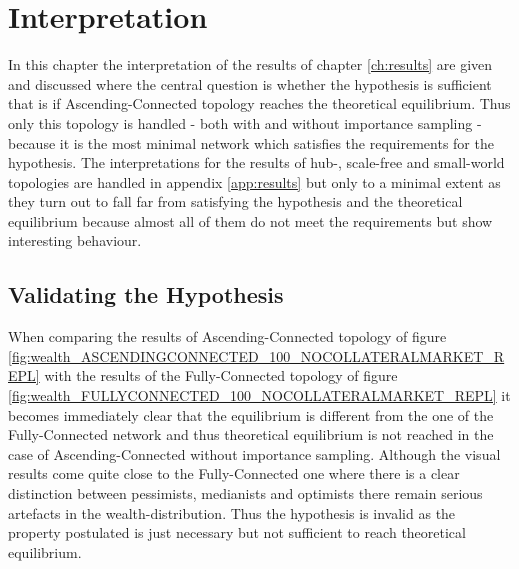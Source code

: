 \documentclass[Bachelorarbeit.tex]{subfiles}
\begin{document}
\graphicspath{{./figures/interpretation/}}	%

\chapter{Interpretation}
\label{ch:interpretation}

In this chapter the interpretation of the results of chapter \ref{ch:results} are given and discussed where the central question is whether the hypothesis is sufficient that is if Ascending-Connected topology reaches the theoretical equilibrium. Thus only this topology is handled - both with and without importance sampling - because it is the most minimal network which satisfies the requirements for the hypothesis. The interpretations for the results of hub-, scale-free and small-world topologies are handled in appendix \ref{app:results} but only to a minimal extent as they turn out to fall far from satisfying the hypothesis and the theoretical equilibrium because almost all of them do not meet the requirements but show interesting behaviour.

\section{Validating the Hypothesis}
When comparing the results of Ascending-Connected topology of figure \ref{fig:wealth_ASCENDINGCONNECTED_100_NOCOLLATERALMARKET_REPL} with the results of the Fully-Connected topology of figure \ref{fig:wealth_FULLYCONNECTED_100_NOCOLLATERALMARKET_REPL} it becomes immediately clear that the equilibrium is different from the one of the Fully-Connected network and thus theoretical equilibrium is not reached in the case of Ascending-Connected without importance sampling. Although the visual results come quite close to the Fully-Connected one where there is a clear distinction between pessimists, medianists and optimists there remain serious artefacts in the wealth-distribution. Thus the hypothesis is invalid as the property postulated is just necessary but not sufficient to reach theoretical equilibrium. 
\end{document}
